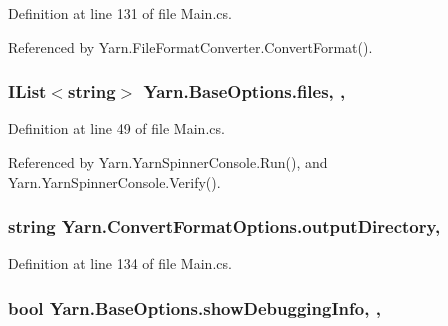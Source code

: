 Definition at line 131 of file Main.\-cs.



Referenced by Yarn.\-File\-Format\-Converter.\-Convert\-Format().

\hypertarget{a00042_aa93cbb1bc1d5328e0a417012621e92d2}{
\subsubsection[{files}]{\setlength{\rightskip}{0pt plus 5cm}I\-List$<$string$>$ Yarn.\-Base\-Options.\-files\hspace{0.3cm}{\ttfamily [get]}, {\ttfamily [set]}, {\ttfamily [inherited]}}}\label{a00042_aa93cbb1bc1d5328e0a417012621e92d2}


Definition at line 49 of file Main.\-cs.



Referenced by Yarn.\-Yarn\-Spinner\-Console.\-Run(), and Yarn.\-Yarn\-Spinner\-Console.\-Verify().

\hypertarget{a00057_ab636bde93c2204b2af1a9306560d9749}{
\subsubsection[{output\-Directory}]{\setlength{\rightskip}{0pt plus 5cm}string Yarn.\-Convert\-Format\-Options.\-output\-Directory\hspace{0.3cm}{\ttfamily [get]}, {\ttfamily [set]}}}\label{a00057_ab636bde93c2204b2af1a9306560d9749}


Definition at line 134 of file Main.\-cs.

\hypertarget{a00042_a89964ea17bd19caf00cb5bff563ed01c}{
\subsubsection[{show\-Debugging\-Info}]{\setlength{\rightskip}{0pt plus 5cm}bool Yarn.\-Base\-Options.\-show\-Debugging\-Info\hspace{0.3cm}{\ttfamily [get]}, {\ttfamily [set]}, {\ttfamily [inherited]}}}\label{a00042_a89964ea17bd19caf00cb5bff563ed01c}


